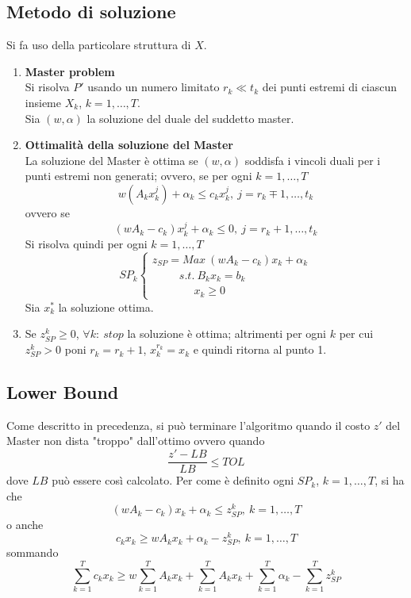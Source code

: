 \subsection{Metodo di soluzione}
Si fa uso della particolare struttura di $X$.
\begin{enumerate}
	\item \textbf{Master problem}\\
	Si risolva $P'$ usando un numero limitato $r_{k}\ll t_{k}$ dei punti estremi di ciascun insieme $X_{k}$, $k=1,\dots,T$.\\
	Sia $(w,\alpha)$ la soluzione del duale del suddetto master.
	\item \textbf{Ottimalità della soluzione del Master}\\
	La soluzione del Master è ottima se $(w,\alpha)$ soddisfa i vincoli duali per i punti estremi non generati; ovvero, se per ogni $k=1,\dots,T$
	\begin{equation*}
		w(A_{k}x_{k}^{j})+\alpha_{k}\le c_{k}x_{k}^{j},\ j=r_{k}\mp 1,\dots,t_{k}
	\end{equation*}
	ovvero se
	\begin{equation*}
			(w A_{k}-c_{k})x_{k}^{j}+\alpha_{k}\le 0,\ j=r_{k}+1,\dots,t_{k}
	\end{equation*}
	Si risolva quindi per ogni $k=1,\dots,T$
	\begin{equation*}
		SP_{k}
		\begin{cases}
			z_{SP}=Max\ (w A_{k}-c_{k})x_{k}+\alpha_{k} \\
			\ \ \ \ \ \ \ \ \ \ \ s.t.\ B_{k}x_{k}=b_{k} \\
			\ \ \ \ \ \ \ \ \ \ \ \ \ \ \ \ \ x_{k}\ge 0
		\end{cases}
	\end{equation*}
	Sia $x_{k}^{*}$ la soluzione ottima.
	\item Se $z_{SP}^{k}\ge 0$, $\forall k:\ stop$ la soluzione è ottima; altrimenti per ogni $k$ per cui $z_{SP}^{k}>0$ poni $r_{k}=r_{k}+1$, $x_{k}^{r_{k}}=x_{k}$ e quindi ritorna al punto 1.
\end{enumerate}

\clearpage
\subsection{Lower Bound}
Come descritto in precedenza, si può terminare l'algoritmo quando il costo $z'$ del Master non dista "troppo" dall'ottimo ovvero quando
\begin{equation*}
	\frac{z'-LB}{LB}\le TOL
\end{equation*}
dove $LB$ può essere così calcolato.
Per come è definito ogni $SP_{k}$, $k=1,\dots,T$, si ha che
\begin{equation*}
	(w A_{k}-c_{k})x_{k}+\alpha_{k}\le z_{SP}^{k},\ k=1,\dots,T
\end{equation*}
o anche
\begin{equation*}
	c_{k}x_{k}\ge w A_{k}x_{k}+\alpha_{k}-z_{SP}^{k},\ k=1,\dots,T
\end{equation*}
sommando
\begin{equation*}
	\sum_{k=1}^{T}c_{k}x_{k}\ge w\sum_{k=1}^{T}A_{k}x_{k}+\sum_{k=1}^{T}A_{k}x_{k}+\sum_{k=1}^{T}\alpha_{k}-\sum_{k=1}^{T}z_{SP}^{k}
\end{equation*}

